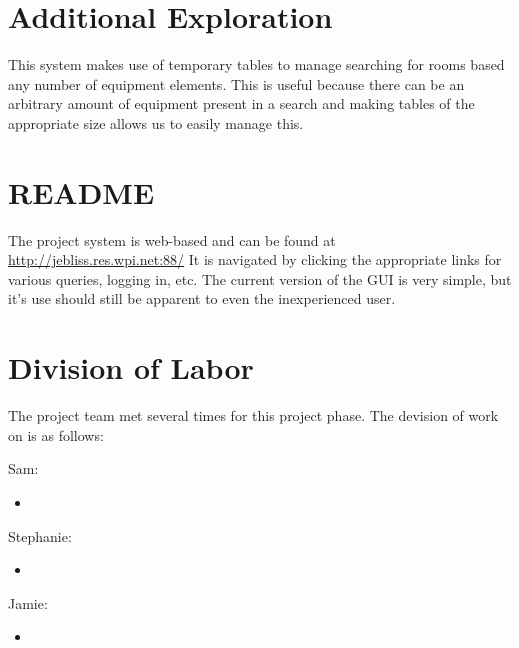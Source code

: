 \documentclass{article}
\begin{document}
\section{Additional Exploration}
This system makes use of temporary tables to manage searching for rooms based any number of equipment elements. This is
useful because there can be an arbitrary amount of equipment present in a search and making tables of the appropriate size
allows us to easily manage this.

\section{README}
The project system is web-based and can be found at \url{http://jebliss.res.wpi.net:88/}
It is navigated by clicking the appropriate links for various queries, logging in, etc.
The current version of the GUI is very simple, but it's use should still be apparent to even the inexperienced user.

\section{Division of Labor}
The project team met several times for this project phase. The devision of work on is as follows:

Sam:
\begin{itemize}
\item
\end{itemize}

Stephanie:
\begin{itemize}
\item
\end{itemize}

Jamie:
\begin{itemize}
\item
\end{itemize}
\end{document}
